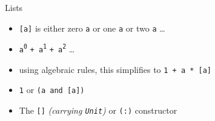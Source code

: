 \begin{frame}
\begin{block}{Lists}
\begin{itemize}
  \item<1-> \lstinline{[a]} is either zero \lstinline{a} or one \lstinline{a} or two \lstinline{a} \ldots
  \item<2-> \lstinline{a}\textsuperscript{\lstinline{0}} \lstinline{+ a}\textsuperscript{\lstinline{1}} \lstinline{+ a}\textsuperscript{\lstinline{2}} \ldots
  \item<3-> using algebraic rules, this simplifies to \lstinline{1 + a * [a]}
  \item<3-> \lstinline{1} or \lstinline{(a and [a])}
  \item<3-> The \lstinline{[]} \emph{(carrying \lstinline{Unit})} or \lstinline{(:)} constructor
\end{itemize}
\end{block}
\end{frame}
